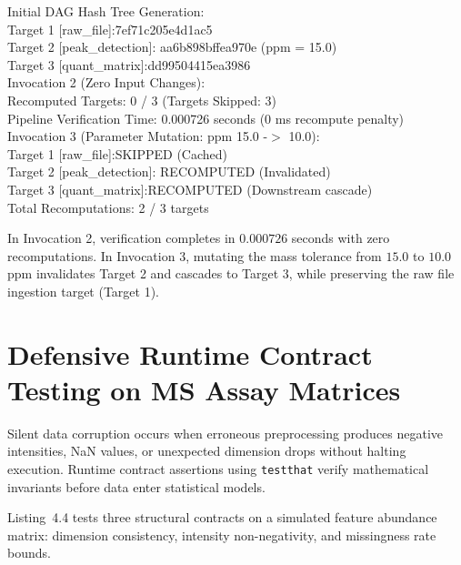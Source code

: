 \documentclass[11pt,twoside,openright]{book}
\begin{document}
\begin{routput}
Initial DAG Hash Tree Generation:\\
\enspace\enspace Target 1 [raw\_file]:\enspace\enspace\enspace\enspace\enspace\enspace 7ef71c205e4d1ac5\\
\enspace\enspace Target 2 [peak\_detection]: aa6b898bffea970e (ppm = 15.0)\\
\enspace\enspace Target 3 [quant\_matrix]:\enspace\enspace dd99504415ea3986\\[0.4em]
Invocation 2 (Zero Input Changes):\\
\enspace\enspace Recomputed Targets: 0 / 3 (Targets Skipped: 3)\\
\enspace\enspace Pipeline Verification Time: 0.000726 seconds (0 ms recompute penalty)\\[0.4em]
Invocation 3 (Parameter Mutation: ppm 15.0 -$>$ 10.0):\\
\enspace\enspace Target 1 [raw\_file]:\enspace\enspace\enspace\enspace\enspace\enspace SKIPPED (Cached)\\
\enspace\enspace Target 2 [peak\_detection]: RECOMPUTED (Invalidated)\\
\enspace\enspace Target 3 [quant\_matrix]:\enspace\enspace RECOMPUTED (Downstream cascade)\\
\enspace\enspace Total Recomputations: 2 / 3 targets
\end{routput}

In Invocation 2, verification completes in $0.000726$ seconds with zero recomputations. In Invocation 3, mutating the mass tolerance from $15.0$ to $10.0$ ppm invalidates Target 2 and cascades to Target 3, while preserving the raw file ingestion target (Target 1).

\FloatBarrier
\section{Defensive Runtime Contract Testing on MS Assay Matrices}
\label{sec:contract_testing}

Silent data corruption occurs when erroneous preprocessing produces negative intensities, NaN values, or unexpected dimension drops without halting execution. Runtime contract assertions using \texttt{testthat} \cite{wickham2011testthat} verify mathematical invariants before data enter statistical models.

Listing~4.4 tests three structural contracts on a simulated feature abundance matrix: dimension consistency, intensity non-negativity, and missingness rate bounds.
\end{document}

